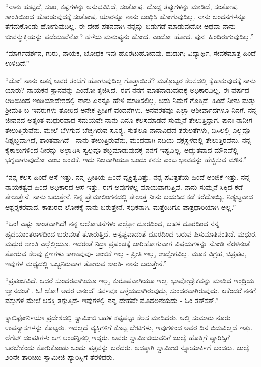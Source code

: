  “ನಾನು ಹುಟ್ಟಿದೆ, ಸುಖ, ಕಷ್ಟಗಳನ್ನು ಅನುಭವಿಸಿದೆ, ಸಂತೋಷ. ದೊಡ್ಡ ತಪ್ಪುಗಳನ್ನು ಮಾಡಿದೆ, ಸಂತೋಷ. ಶಾಂತಿಯಿಂದ ಹೊರಡುವುದಕ್ಕೆ ಸಂತೋಷ. ಯಾರನ್ನೂ ನಾನು ಬಂಧಿಸಿ ಹೋಗುವುದಿಲ್ಲ. ನಾನು ಬಂಧನಗಳನ್ನೂ ತೆಗೆದುಕೊಂಡು ಹೋಗುವುದಿಲ್ಲ. ಈ ದೇಹ ಪತನವಾಗಿ ನನ್ನನ್ನು ಬಿಡುಗಡೆ ಮಾಡುವುದೋ ಅಥವಾ ನಾನು ಜೀವನ್ಮುಕ್ತಿಯನ್ನು ಪಡೆಯುವೆನೋ? ಹಳೆಯ ಮನುಷ್ಯನು ಹೋದ. ಎಂದೋ ಹೋದ. ಪುನಃ ಹಿಂದಿರುಗುವುದಿಲ್ಲ.” 

 “ಮಾರ್ಗದರ್ಶನ, ಗುರು, ನಾಯಕ, ಬೋಧಕ ಇವು ಹೊರಟುಹೋದವು. ಹುಡುಗ; ವಿದ್ಯಾರ್ಥಿ, ಸೇವಕಮಾತ್ರ ಹಿಂದೆ ಉಳಿದಿದೆ.” 

 “ಜೋ! ನಾನು ಏತಕ್ಕೆ ಅವರ ತಂಟೆಗೆ ಹೋಗುವುದಿಲ್ಲ ಗೊತ್ತಾಯಿತೆ? ಮತ್ತೊಬ್ಬರ ಕೆಲಸದಲ್ಲಿ ಕೈಹಾಕುವುದಕ್ಕೆ ನಾನು ಯಾರು? ನಾಯಕನ ಸ್ಥಾನವನ್ನು ಎಂದೋ ತ್ಯಜಿಸಿದೆ. ಈಗ ನನಗೆ ಮಾತನಾಡುವುದಕ್ಕೆ ಅಧಿಕಾರವಿಲ್ಲ. ಈ ವರ್ಷದ ಆದಿಯಿಂದ ಇಂಡಿಯಾದೇಶದಲ್ಲಿ ನಾನು ಏನನ್ನೂ ಹೇಳಿ ಮಾಡಿಸಲಿಲ್ಲ. ಅದು ನಿಮಗೆ ಗೊತ್ತಿದೆ. ಹಿಂದೆ ನೀನು ಮತ್ತು ಶ‍್ರೀಮತಿ ಬ-ಇವರುಗಳು ತೋರಿದ ಅನೇಕ ಪ್ರೀತಿಗೆ ವಂದನೆಗಳು. ಅನವರತವೂ ಎಲ್ಲಾ ಆಶೀರ್ವಾದಗಳೂ ನಿನಗೆ. ನನ್ನ ಜೀವನದ ಅತ್ಯಂತ ಮಧುರವಾದ ಸಮಯವೇ ನಾನು ಏನೂ ಕೆಲಸಮಾಡದೆ ಸುಮ್ಮನೆ ತೇಲುತ್ತಿದ್ದಾಗ. ಪುನಃ ನಾನೀಗ ತೇಲುತ್ತಿರುವೆನು. ಮೇಲೆ ಬೆಳಗುವ ಬೆಚ್ಚಗಿರುವ ಸೂರ‍್ಯ. ಸುತ್ತಲೂ ನಾನಾವಿಧದ ತರುಲತೆಗಳು, ಬಿಸಿಲಲ್ಲಿ ಎಲ್ಲವೂ ನಿಶ್ಯಬ್ದವಾಗಿದೆ, ಶಾಂತವಾಗಿದೆ - ನಾನು ತೇಲುತ್ತಿರುವೆನು, ಮಂದವಾಗಿ ನದಿಯ ವಕ್ಷಸ್ಥಳದಲ್ಲಿ ತೇಲುತ್ತಿರವೆನು. ನನ್ನ ಕೈಕಾಲುಗಳಿಂದ ನೀರನ್ನು ಅಲ್ಲಾಡಿಸಿ ಸ್ವಲ್ಪವೂ ಶಬ್ದಮಾಡುವುದಕ್ಕೆ ನನಗೆ ಇಷ್ಟವಿಲ್ಲ. ಅದ್ಭುತವಾದ ಮೌನವೆಲ್ಲಿ ಭಗ್ನವಾಗುವುದೋ ಎಂಬ ಅಂಜಿಕೆ. ಇದು ನಿಜವಾಗಿಯೂ ಒಂದು ಕನಸು ಎಂಬ ಭಾವವನ್ನು ಹೆಚ್ಚಿಸುವ ಮೌನ.” 

 “ನನ್ನ ಕೆಲಸ ಹಿಂದೆ ಆಸೆ ಇತ್ತು. ನನ್ನ ಪ್ರೀತಿಯ ಹಿಂದೆ ವ್ಯಕ್ತಿತ್ವವಿತ್ತು. ನನ್ನ ಪವಿತ್ರತೆಯ ಹಿಂದೆ ಅಂಜಿಕೆ ಇತ್ತು. ನನ್ನ ನಾಯಕತ್ವದ ಹಿಂದೆ ಅಧಿಕಾರದ ಆಸೆ ಇತ್ತು. ಈಗ ಅವುಗಳೆಲ್ಲ ಮಾಯವಾಗುತ್ತಿವೆ. ನಾನು ಸುಮ್ಮನೆ ಸಿಕ್ಕಿದ ಕಡೆ ತೇಲುತ್ತೇನೆ. ನಾನು ಬರುತ್ತೇನೆ. ನಿನ್ನ ಪ್ರೇಮಾಲಿಂಗನದಲ್ಲಿ ತೇಲುತ್ತ ನೀನು ಬಯಸಿದ ಕಡೆ ಕರೆದೊಯ್ಯಿ. ನಿಶ್ಯಬ್ದವಾದ ಆಶ್ಚರ‍್ಯಕರವಾದ, ಕಾತುರದ ಲೋಕಕ್ಕೆ ನಾನು ಬರುತ್ತೇನೆ. ಸಭಿಕನಾಗಿ, ಮತ್ತೆಂದಿಗೂ ಪಾತ್ರಧಾರಿಯಾಗಿ ಅಲ್ಲ.” 

 “ಓಂ! ಎಷ್ಟು ಶಾಂತವಾಗಿದೆ! ನನ್ನ ಆಲೋಚನೆಗಳು ಎಲ್ಲೋ ದೂರದಿಂದ, ಬಹಳ ದೂರದಿಂದ ನನ್ನ ಹೃದಯಾಂತರಾಳದಿಂದ ಬರುವಂತೆ ತೋರುತ್ತಿದೆ. ಅಸ್ಪಷ್ಟವಾದಂತೆ ದೂರದಿಂದ ಬರುವ ಪಿಸುಮಾತಿನಂತಿದೆ. ಮಧುರ, ಮಧುರ ಶಾಂತಿ ಎಲ್ಲೆಲ್ಲಿಯೂ. ಇದರಂತೆ ನಿದ್ರಾ ಪ್ರಪಂಚಕ್ಕೆ ಜಾರಿಹೋಗುವಾಗ ವಿಷಯಗಳನ್ನು ನೋಡಿ ನೆರಳಿನಂತೆ ತೋರುವ ಕೆಲವು ಕ್ಷಣಗಳು ಕಾಣುವುವು- ಅಂಜಿಕೆ ಇಲ್ಲ - ಪ್ರೀತಿ ಇಲ್ಲ, ಉದ್ವೇಗವಿಲ್ಲ. ಮೂಕ ವಿಗ್ರಹ, ಚಿತ್ರಪಟ, ಇವುಗಳ ಮಧ್ಯದಲ್ಲಿ ಒಬ್ಬನಿರುವಾಗ ತೋರುವ ಶಾಂತಿ- ನಾನು ಬರುತ್ತೇನೆ.” 

 “ಪ್ರಪಂಚವಿದೆ. ಆದರೆ ಸುಂದರವಾಗಿಯೂ ಇಲ್ಲ, ಕುರೂಪವಾಗಿಯೂ ಇಲ್ಲ. ಭಾವೋದ್ರೇಕವನ್ನು ಮಾಡಿದ ಇಂದ್ರಿಯ ಜ್ಞಾನದಂತೆ . ಓ! ಜೋ! ಅದರ ಆನಂದ! ಸರ್ವವೂ ಒಳ್ಳೆಯದಾಗಿರುವುದು, ಸುಂದರವಾಗಿರುವುದು. ಏಕೆಂದರೆ ನನಗೆ ವಸ್ತುಗಳ ಮೇಲೆ ಆಸಕ್ತಿ ತಗ್ಗುತ್ತಿದೆ- ಇವುಗಳಲ್ಲಿ ನನ್ನ ದೇಹವೇ ಮೊದಲನೆಯದು - ಓಂ ತತ್‍ಸತ್.” 

 ಕ್ಯಾಲಿಫೋರ್ನಿಯಾ ಪ್ರದೇಶದಲ್ಲಿ ಸ್ವಾಮೀಜಿ ಬಹಳ ಕಷ್ಟಪಟ್ಟು ಕೆಲಸ ಮಾಡಿದರು. ಅಲ್ಲಿ ಸುಮಾರು ನೂರು ಉಪನ್ಯಾಸಗಳನ್ನು ಕೊಟ್ಟರು. ಇದಲ್ಲದೆ ವ್ಯಕ್ತಿಗಳಿಗೆ ಕೊಟ್ಟ ಭೇಟಿಗಳು, ಇವುಗಳಿಂದ ಅವರ ದಿನ ಬಿಡುವಿಲ್ಲದೆ ಇತ್ತು. ಲೆಗೆಟ್ ದಂಪತಿಗಳು ಆಗ ಲಂಡನ್ನಿನಲ್ಲಿ ಇದ್ದರು. ಅವರು ಸ್ವಾಮೀಜಿಯವರಿಗೆ ಜುಲೈ ಹೊತ್ತಿಗೆ ಪ್ಯಾರಿಸ್ಸಿಗೆ ಬರಬೇಕೆಂದು ಕೋರಿಕೊಂಡು ಒಂದು ಪತ್ರವನ್ನು ಬರೆದರು. ಅದಕ್ಕಾಗಿ ಸ್ವಾಮೀಜಿ ನ್ಯೂಯಾರ್ಕಿಗೆ ಬಂದರು. ಜುಲೈ ೨೦ನೇ ತಾರೀಖು ಸ್ವಾಮೀಜಿ ಪ್ಯಾರಿಸ್ಸಿಗೆ ತೆರಳಿದರು. 

